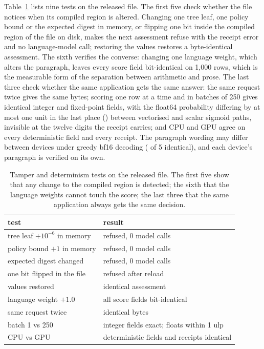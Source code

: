 \documentclass[twocolumn,10pt]{article}
\begin{document}
Table~\ref{tab:tamper} lists nine tests on the released file. The first five check whether the file notices when its
compiled region is altered. Changing one tree leaf, one policy bound or the expected digest in memory, or flipping one bit
inside the compiled region of the file on disk, makes the next assessment refuse with the receipt error and no
language-model call; restoring the values restores a byte-identical assessment. The sixth verifies the converse: changing one
language weight, which alters the paragraph, leaves every score field bit-identical on 1{,}000 rows, which is the
measurable form of the separation between arithmetic and prose. The last three check whether the same application gets the
same answer: the same request twice gives the same bytes; scoring one row at a time and in batches of 250 gives identical
integer and fixed-point fields, with the float64 probability differing by at most one unit in the last place
(\nTamperFloatDiff{}) between vectorised and scalar sigmoid paths, invisible at the twelve digits the receipt carries; and
CPU and GPU agree on every deterministic field and every receipt. The paragraph wording may differ between devices under
greedy bf16 decoding (\nExplIdenticalCPUGPU{} of 5 identical), and each device's paragraph is verified on its own.

\begin{table}[t]
\centering\footnotesize
\caption{Tamper and determinism tests on the released file. The first five show that any change to the compiled region is detected; the sixth that the language weights cannot touch the score; the last three that the same application always gets the same decision.}
\label{tab:tamper}
\begin{tabular}{@{}lp{4.3cm}@{}}
\toprule
test & result \\
\midrule
tree leaf $+10^{-6}$ in memory & refused, 0 model calls \\
policy bound $+1$ in memory & refused, 0 model calls \\
expected digest changed & refused, 0 model calls \\
one bit flipped in the file & refused after reload \\
values restored & identical assessment \\
language weight $+1.0$ & all score fields bit-identical \\
same request twice & identical bytes \\
batch 1 vs 250 & integer fields exact; floats within 1 ulp \\
CPU vs GPU & deterministic fields and receipts identical \\
\bottomrule
\end{tabular}
\end{table}
\end{document}
